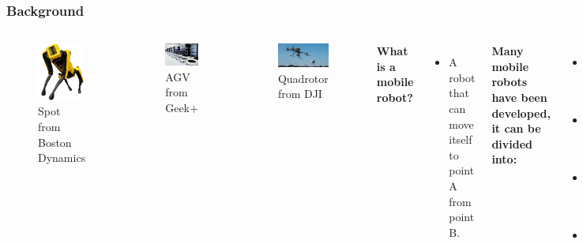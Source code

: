 \begin{frame} %
\frametitle{Background}

\begin{columns}
\begin{figure}
    \centering
    \includegraphics[width=2cm]{photos/boston-dynamics-spot.jpg} 
    \vspace{-0.3cm}
    \caption{Spot from Boston Dynamics}
    \label{fig:spot}
    \vspace{-0.7cm}
\end{figure}

\begin{figure}
    \centering
    \includegraphics[width=3.2cm]{photos/Geek+ Picking.jpg}
    \vspace{-0.3cm}
    \caption{AGV from Geek+}
    \vspace{-0.7cm}
    \label{fig:geekplus}
\end{figure}

\begin{figure}
    \centering
    \includegraphics[width=3.2cm]{photos/dji.jpg}
    \vspace{-0.3cm}
    \caption{Quadrotor from DJI}
    \label{fig:grass}
\end{figure}


\textbf{What is a mobile robot?}
\begin{itemize}
    \item A robot that can move itself to point A from point B. 
\end{itemize}

\textbf{Many mobile robots have been developed, it can be divided into: }
\begin{itemize}
    \item Legged mobile robots
    \item Wheeled mobile robots
    \item Aerial mobile robots
    \item ...
\end{itemize}
\end{columns}
\end{frame}

